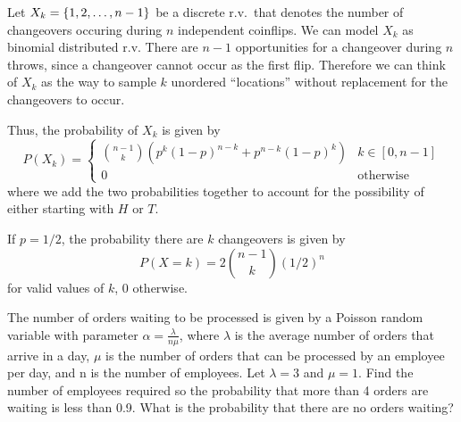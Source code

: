 \documentclass{article}
\begin{document}
    \begin{solution}
        Let $X_k = \{1, 2, \ldots, n - 1\}$ be a discrete r.v.~that denotes the number of changeovers occuring during $n$ independent coinflips. We can model $X_k$ as binomial distributed r.v. There are $n - 1$ opportunities for a changeover during $n$ throws, since a changeover cannot occur as the first flip. Therefore we can think of $X_k$ as the way to sample $k$ unordered ``locations'' without replacement for the changeovers to occur.

        Thus, the probability of $X_k$ is given by
        \begin{equation}
            P(X_k) = 
            \begin{cases}
                \binom{n - 1}{k} (p^k(1-p)^{n-k} + p^{n-k}(1-p)^k) & k \in [0, n - 1] \\
                0 & \text{otherwise}
            \end{cases}
        \end{equation}
        where we add the two probabilities together to account for the possibility of either starting with $H$ or $T$.

        If $p = 1/2$, the probability there are $k$ changeovers is given by
        \begin{equation}
            P(X = k) = 2 \binom{n - 1}{k} (1/2)^n
        \end{equation}
        for valid values of $k$, $0$ otherwise.

    \end{solution}

    \nextproblem
    \nextproblem
    \begin{problem}
        The number of orders waiting to be processed is given by a Poisson random variable with parameter $\alpha = \frac{\lambda} {n \mu}$, where $\lambda$ is the average number of orders that arrive in a day, $\mu$ is the number of orders that can be processed by an employee per day, and n is the number of employees. Let $ \lambda = 3$ and $\mu = 1$. Find the number of employees required so the probability that more than 4 orders are waiting is less than 0.9. What is the probability that there are no orders waiting?
    \end{problem}
\end{document}
